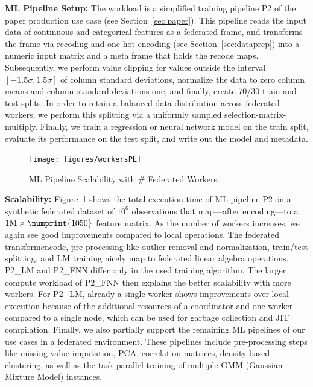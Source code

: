 \documentclass[sigconf,screen]{acmart}
\newcommand{\num}[1]{\numprint{#1}}
\begin{document}
\textbf{ML Pipeline Setup:} The workload is a simplified training pipeline P2 of the paper production use case (see Section~\ref{sec:paper}). This pipeline reads the input data of continuous and categorical features as a federated frame, and transforms the frame via recoding and one-hot encoding (see Section~\ref{sec:dataprep}) into a numeric input matrix and a meta frame that holds the recode maps. Subsequently, we perform value clipping for values outside the interval $[-1.5\sigma,1.5\sigma]$ of column standard deviations, normalize the data to zero column means and column standard deviations one, and finally, create 70/30 train and test splits. In order to retain a balanced data distribution across federated workers, we perform this splitting via a uniformly sampled selection-matrix-multiply. Finally, we train a regression or neural network model on the train split, evaluate its performance on the test split, and write out the model and metadata.

\begin{figure}[!t]
	\centering
	\texttt{[image: figures/workersPL]}
	\vspace{-0.25cm}
	\caption{\label{fig:exp4}ML Pipeline Scalability with \# Federated Workers.}
\end{figure}

\textbf{Scalability:} Figure~\ref{fig:exp4} shows the total execution time of ML pipeline P2 on a synthetic federated dataset of $10^6$ observations that map---after encoding---to a $1\text{M} \times \num{1050}$ feature matrix. As the number of workers increases, we again see good improvements compared to local operations. The federated transformencode, pre-processing like outlier removal and normalization, train/test splitting, and LM training nicely map to federated linear algebra operations. P2\_LM and P2\_FNN differ only in the used training algorithm. The larger compute workload of P2\_FNN then explains the better scalability with more workers. For P2\_LM, already a single worker shows improvements over local execution because of the additional resources of a coordinator and one worker compared to a single node, which can be used for garbage collection and JIT compilation. Finally, we also partially support the remaining ML pipelines of our use cases in a federated environment. These pipelines include pre-processing steps like missing value imputation, PCA, correlation matrices, density-based clustering, as well as the task-parallel training of multiple GMM (Gaussian Mixture Model) instances. 
\end{document}
